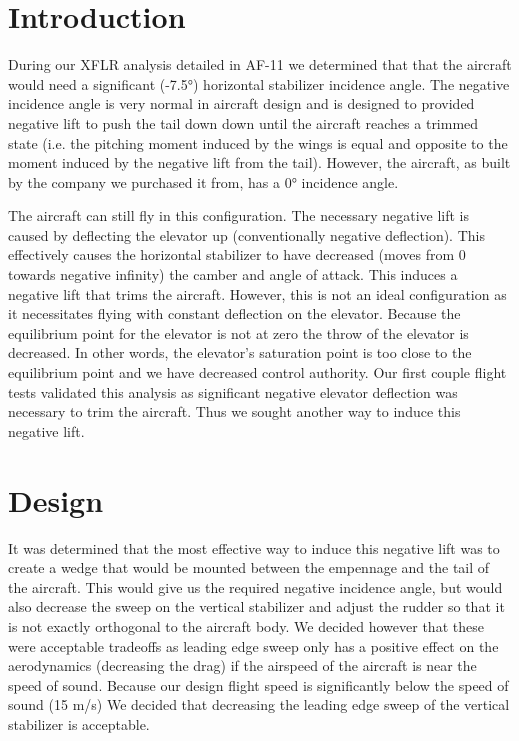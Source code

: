 \documentclass[]{auvsi_doc}
\begin{document}
\begin{AUVSITitlePage}
\begin{artifacttable} 
\end{artifacttable}

\end{AUVSITitlePage}
\section{Introduction}

During our XFLR analysis detailed in AF-11 we determined that that the aircraft would need a significant (-7.5°) horizontal stabilizer incidence angle. The negative incidence angle is very normal in aircraft design and is designed to provided negative lift to push the tail down down until the aircraft reaches a trimmed state (i.e. the pitching moment induced by the wings is equal and opposite to the moment induced by the negative lift from the tail). However, the aircraft, as built by the company we purchased it from, has a 0° incidence angle. 

The aircraft can still fly in this configuration. The necessary negative lift is caused by deflecting the elevator up (conventionally negative deflection). This effectively causes the horizontal stabilizer to have decreased (moves from 0 towards negative infinity) the camber and angle of attack. This induces a negative lift that trims the aircraft.  However, this is not an ideal configuration as it necessitates flying with constant deflection on the elevator. Because the equilibrium point for the elevator is not at zero the throw of the elevator is decreased. In other words, the elevator's saturation point is too close to the equilibrium point and we have decreased control authority. Our first couple flight tests validated this analysis as significant negative elevator deflection was necessary to trim the aircraft. Thus we sought another way to induce this negative lift. 

\section{Design}

It was determined that the most effective way to induce this negative lift was to create a wedge that would be mounted between the empennage and the tail of the aircraft. This would give us the required negative incidence angle, but would also decrease the sweep on the vertical stabilizer and adjust the rudder so that it is not exactly orthogonal to the aircraft body. We decided however that these were acceptable tradeoffs as leading edge sweep only has a positive effect on the aerodynamics (decreasing the drag) if the airspeed of the aircraft is near the speed of sound. Because our design flight speed is significantly below the speed of sound (15 m/s) We decided that decreasing the leading edge sweep of the vertical stabilizer is acceptable.
 
\end{document}
